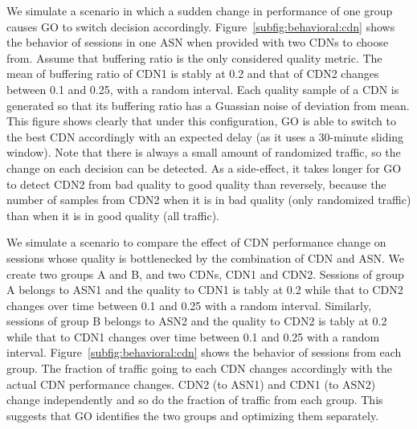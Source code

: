  We simulate a scenario in which a sudden change in performance of one group causes GO to switch decision accordingly. Figure~\ref{subfig:behavioral:cdn} shows the behavior of sessions in one ASN when provided with two CDNs to choose from. Assume that buffering ratio is the only considered quality metric. The mean of buffering ratio of CDN1 is stably at 0.2 and that of CDN2 changes between 0.1 and 0.25, with a random interval. Each quality sample of a CDN is generated so that its buffering ratio has a Guassian noise of \fillme deviation from mean. This figure shows clearly that under this configuration, GO is able to switch to the best CDN accordingly with an expected delay (as it uses a 30-minute sliding window). Note that there is always a small amount of randomized traffic, so the change on each decision can be detected. As a side-effect, it takes longer for GO to detect CDN2 from bad quality to good quality than reversely, because the number of samples from CDN2 when it is in bad quality (only randomized traffic) than when it is in good quality (all traffic).

 We simulate a scenario to compare the effect of CDN performance change on sessions whose quality is bottlenecked by the combination of CDN and ASN.
We create two groups A and B, and two CDNs, CDN1 and CDN2. Sessions of group A belongs to ASN1 and the quality to CDN1 is tably at 0.2 while that to CDN2 changes over time between 0.1 and 0.25 with a random interval. Similarly, sessions of group B belongs to ASN2 and the quality to CDN2 is tably at 0.2 while that to CDN1 changes over time between 0.1 and 0.25 with a random interval. Figure~\ref{subfig:behavioral:cdn} shows the behavior of sessions from each group. The fraction of traffic going to each CDN changes accordingly with the actual CDN performance changes. CDN2 (to ASN1) and CDN1 (to ASN2) change independently and so do the fraction of traffic from each group. This suggests that GO identifies the two groups and optimizing them separately.



